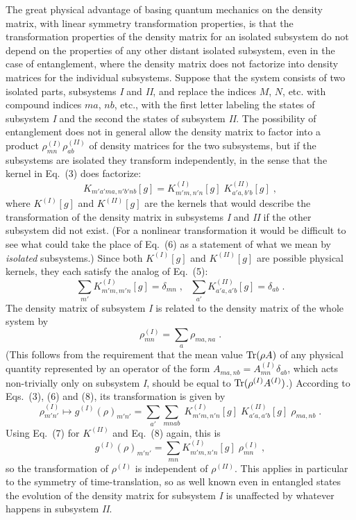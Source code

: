 The great physical advantage of basing quantum mechanics on the density matrix, with linear symmetry transformation properties, is that the transformation properties of the density matrix for an isolated subsystem do not depend on the properties of any other distant isolated subsystem, even in the case of entanglement, where the density matrix does not factorize into density matrices for the individual subsystems.  Suppose that the system consists of two isolated parts, subsystems {\em I} and {\em II}, and replace the indices $M$, $N$, etc. with compound indices $ma$, $nb$, etc.,  with the first letter labeling  the states of subsystem {\em I} and the second the states of subsystem {\em II}.  The possibility of entanglement does not in general allow the density matrix to factor into a product $\rho^{(I)}_{mn}\rho^{(II)}_{ab}$ of density matrices for the two subsystems, but if the subsystems are isolated they transform independently, in the sense that the kernel in Eq.~(3) does factorize:
\begin{equation}
K_{m'a'ma,n'b'nb}[g]=K^{(I)}_{m'm,n'n}[g]\;K^{(II)}_{a'a,b'b}[g]\;,
\end{equation}
where $K^{(I)}[g]$ and $K^{(II)}[g]$ are the kernels that would describe the transformation of the density matrix in subsystems {\em I} and {\em II} if the other subsystem did not exist.  
(For a nonlinear transformation it would be  difficult to see what could take the place of Eq.~(6) as a statement of   what we mean by {\em isolated} subsystems.)
Since both $K^{(I)}[g]$ and $K^{(II)}[g]$ are possible physical kernels, they each satisfy the analog of Eq.~(5):
\begin{equation}
\sum_{m'}K^{(I)}_{m'm,m'n}[g]=\delta_{mn}\;,~~~\sum_{a'} K^{(II)}_{a'a,a'b}[g] =\delta_{ab}\;.
\end{equation}
  The density matrix of subsystem {\em I} is related to the density matrix of the whole system by
\begin{equation}
\rho_{mn}^{(I)}=\sum_a\rho_{ma,na}\;.
\end{equation}
(This follows from the requirement that the mean value ${\rm Tr}(\rho A)$ of any physical quantity represented by an operator of the form $A_{ma,nb}=A^{(I)}_{mn}\delta_{ab}$, which acts non-trivially only on subsystem {\em I}, should be equal to ${\rm Tr}(\rho^{(I)} A^{(I)})$.)
According to Eqs.~(3), (6) and (8), its transformation is given by
$$
\rho_{m'n'}^{(I)}\mapsto g^{(I)}(\rho)_{m'n'}=\sum_{a'}\sum_{mnab}\;K^{(I)}_{m'm,n'n}[g]\;K^{(II)}_{a'a,a'b}[g]\;\rho_{ma,nb}\;.
$$
Using Eq.~(7) for $K^{(II)}$ and Eq.~(8) again, this is
\begin{equation}
g^{(I)}(\rho)_{m'n'}=\sum_{mn}K^{(I)}_{m'm,n'n}[g]\;\rho_{mn}^{(I)}\;,
\end{equation}
so the transformation of $\rho^{(I)}$ is independent of $\rho^{(II)}$.  
This applies in particular to the symmetry of time-translation, so as well known even in entangled states the evolution of the density matrix for subsystem {\em I} is unaffected by whatever happens in subsystem {\em II}.

